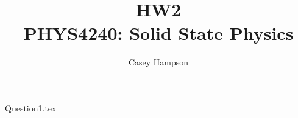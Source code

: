 \documentclass[titlepage]{article}
\title{HW2 \\[5pt] PHYS4240: Solid State Physics}
\author{Casey Hampson}
\begin{document}
    \maketitle
    \pagebreak

    {Question1.tex}
\end{document}
